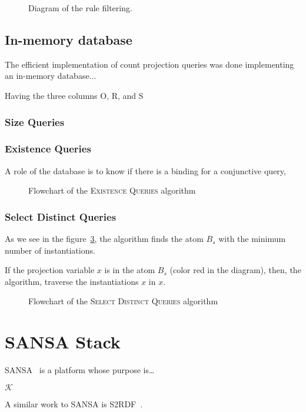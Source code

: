 \documentclass{article}
\newcommand{\K}{\mathcal{K}}
\begin{document}
\begin{figure}[H]
\centering
\resizebox{!}{0.50\textheight}{%
    
}
\caption{Diagram of the rule filtering.}
\label{fig:accepted_for_output}
\end{figure}


\subsection{In-memory database}
\label{ssec:in_memory_database}

The efficient implementation of count projection queries was done implementing
an in-memory database...

Having the three columns O, R, and S

\subsubsection{Size Queries}
\label{sssec:size_queries}

\subsubsection{Existence Queries}
\label{sssec:existence_queries}

A role of the database is to know if there is a binding for a conjunctive query,

\begin{figure}[H]
\centering
\resizebox{!}{0.70\textheight}{%
    
}
\caption{Flowchart of the \textsc{Existence Queries} algorithm}
\label{fig:existence_queries}
\end{figure}

\subsubsection{Select Distinct Queries}
\label{ssec:select_distinct_queries}

As we see in the figure~\ref{fig:select_distinct_queries}, the algorithm finds
the atom $B_s$ with the minimum number of instantiations. 

If the projection variable $x$ is in the atom $B_s$ (color red in the diagram),
then, the algorithm, traverse the instantiations $x$ in $x$.

\begin{figure}[H]
\centering
\caption{Flowchart of the \textsc{Select Distinct Queries} algorithm}
\label{fig:select_distinct_queries}
\end{figure}

\section{SANSA Stack}

SANSA~\cite{lehmann-2017-sansa-iswc} is a platform whose purpose is\ldots

$\K$

A similar work to SANSA is S2RDF~\cite{schatzle2016s2rdf}.



\end{document}
